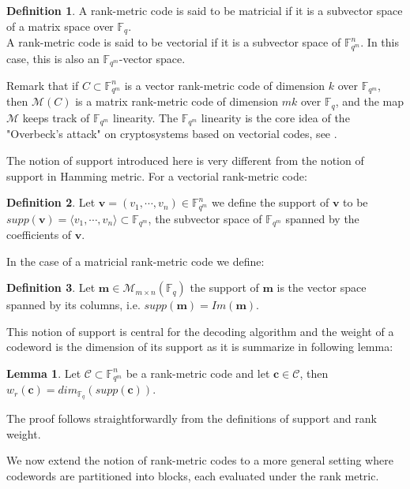 \documentclass{article}
\newcommand{\Fq}{\mathbb{F}_q}
\newcommand{\Fqm}{\mathbb{F}_{q^m}}
\theoremstyle{definition}
\newtheorem{lemma}[theorem]{Lemma}
\newtheorem{definition}{Definition}
\begin{document}
\begin{definition}
      A rank-metric code is said to be matricial if it is a subvector space of a matrix space over $\Fq$.\\
      A rank-metric code is said to be vectorial if it is a subvector space of $\Fqm^n$. In this case, this is also an $\Fqm$-vector space.
\end{definition}


Remark that if $C\subset \mathbb{F}_{q^m}^n$ is a vector rank-metric code of dimension $k$ over $\mathbb{F}_{q^m}$, then $\mathcal{M}(C)$ is a matrix rank-metric code of dimension $mk$ over $\mathbb{F}_q$, and the map $\mathcal{M}$ keeps track of $\Fqm$ linearity. The $\Fqm$ linearity is the core idea of the "Overbeck's attack" on cryptosystems based on vectorial codes, see \cite{overbeck2008structural}. \\
\color{black}

\noindent The notion of support introduced here is very different from the notion of support in Hamming metric. For a vectorial rank-metric code:

\begin{definition}
      Let $\mathbf{v}=(v_1,\cdots,v_n) \in \Fqm^n$ we define the support of $\mathbf{v}$ to be $ supp(\mathbf{v})=\langle v_1,\cdots , v_n\rangle \subset \Fqm$, the subvector space of $\Fqm$ spanned by the coefficients of $\mathbf{v}$.
\end{definition}

In the case of a matricial rank-metric code we define:

\begin{definition}
      Let $\mathbf{m} \in \mathcal{M}_{m \times n}(\Fq)$ the support of $\mathbf{m}$ is the vector space spanned by its columns, i.e. $ supp(\mathbf{m})=Im(\mathbf{m})$.
\end{definition}

This notion of support is central for the decoding algorithm and the weight of a codeword is the dimension of its support as it is summarize in following lemma:
\begin{lemma}
      Let $\mathcal{C} \subset \Fqm^n$ be a rank-metric code and let $\mathbf{c} \in \mathcal{C}$, then $w_r(\mathbf{c})=dim_{\Fq}( supp(\mathbf{c}))$.
\end{lemma}

The proof follows straightforwardly from the definitions of support and rank weight.

\noindent We now extend the notion of rank-metric codes to a more general setting where codewords are partitioned into blocks, each evaluated under the rank metric.
\end{document}
